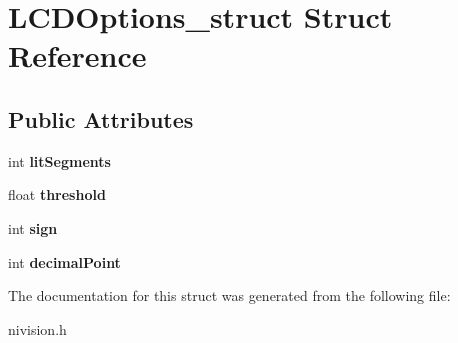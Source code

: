 \hypertarget{structLCDOptions__struct}{
\section{LCDOptions\_\-struct Struct Reference}
\label{structLCDOptions__struct}
}
\subsection*{Public Attributes}
\begin{DoxyCompactItemize}
\item 
\hypertarget{structLCDOptions__struct_a0a27e9d50a79477eaca4cd315559c48a}{
int {\bfseries litSegments}}
\label{structLCDOptions__struct_a0a27e9d50a79477eaca4cd315559c48a}

\item 
\hypertarget{structLCDOptions__struct_ac418dbf2acd613acfeef9f53d06b0399}{
float {\bfseries threshold}}
\label{structLCDOptions__struct_ac418dbf2acd613acfeef9f53d06b0399}

\item 
\hypertarget{structLCDOptions__struct_ac60122b89ac6093118312df8044eb318}{
int {\bfseries sign}}
\label{structLCDOptions__struct_ac60122b89ac6093118312df8044eb318}

\item 
\hypertarget{structLCDOptions__struct_a9d5e40201b26de32f3c944dfd02a85ac}{
int {\bfseries decimalPoint}}
\label{structLCDOptions__struct_a9d5e40201b26de32f3c944dfd02a85ac}

\end{DoxyCompactItemize}


The documentation for this struct was generated from the following file:\begin{DoxyCompactItemize}
\item 
nivision.h\end{DoxyCompactItemize}
